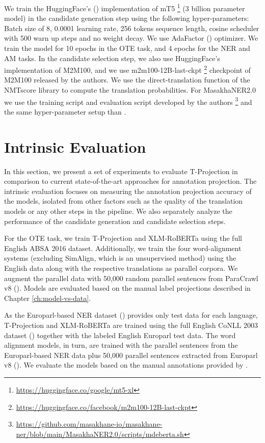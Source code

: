 We train the HuggingFace's (\cite{DBLP:journals/corr/abs-1910-03771})  implementation of mT5  \footnote{\url{https://huggingface.co/google/mt5-xl}} (3 billion parameter model) in the candidate generation step using the following hyper-parameters: Batch size of 8, 0.0001 learning rate, 256 tokens sequence length, cosine scheduler with 500 warn up steps and no weight decay. We use AdaFactor (\cite{DBLP:conf/icml/ShazeerS18}) optimizer. We train the model for 10 epochs in the OTE task, and 4 epochs for the NER and AM tasks. 
In the candidate selection step, we also use HuggingFace's implementation of M2M100, and we use m2m100-12B-last-ckpt \footnote{\url{https://huggingface.co/facebook/m2m100-12B-last-ckpt}} checkpoint of M2M100 released by the authors. We use the direct-translation function of the NMTscore library to compute the translation probabilities. 
For MasakhaNER2.0 we use the training script and evaluation script developed by the authors \footnote{\url{https://github.com/masakhane-io/masakhane-ner/blob/main/MasakhaNER2.0/scripts/mdeberta.sh}} and the same hyper-parameter setup than \citet{chen-etal-2023-frustratingly}. 


\section{Intrinsic Evaluation} \label{sec5:IntrinsicEvaluation}


In this section, we present a set of experiments to evaluate T-Projection in comparison to current state-of-the-art approaches for annotation projection. The intrinsic evaluation focuses on measuring the annotation projection accuracy of the models, isolated from other factors such as the quality of the translation models or any other steps in the pipeline. We also separately analyze the performance of the candidate generation and candidate selection steps.

For the OTE task, we train T-Projection and XLM-RoBERTa using the full English ABSA 2016 dataset. Additionally, we train the four word-alignment systems (excluding SimAlign, which is an unsupervised method) using the English data along with the respective translations as parallel corpora. We augment the parallel data with 50,000 random parallel sentences from ParaCrawl v8 (\cite{espla-etal-2019-paracrawl}). Models are evaluated based on the manual label projections described in Chapter \ref{ch:model-vs-data}.

As the Europarl-based NER dataset (\cite{agerri-etal-2018-building}) provides only test data for each language, T-Projection and XLM-RoBERTa are trained using the full English CoNLL 2003 dataset (\cite{DBLP:conf/conll/SangM03}) together with the labeled English Europarl test data. The word alignment models, in turn, are trained with the parallel sentences from the Europarl-based NER data plus 50,000 parallel sentences extracted from Europarl v8 (\cite{DBLP:conf/mtsummit/Koehn05}). We evaluate the models based on the manual annotations provided by \citet{agerri-etal-2018-building}.

